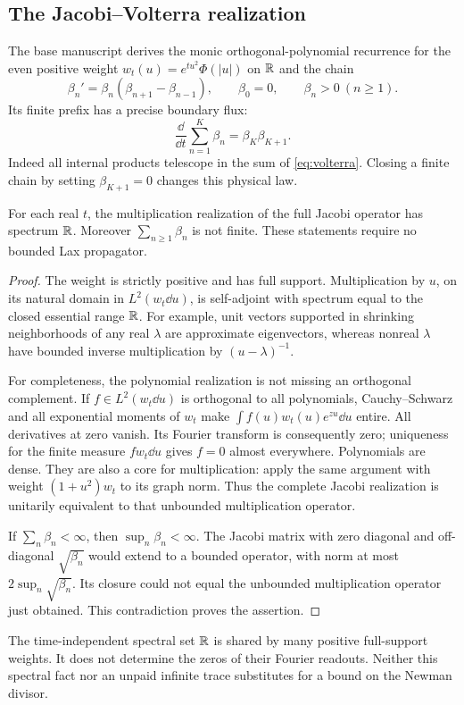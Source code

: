\subsection{The Jacobi--Volterra realization}
The base manuscript \cite{BakerVolterra2026} derives the monic
orthogonal-polynomial recurrence for the even positive weight
$w_t(u)=e^{tu^2}\Phi(|u|)$ on $\mathbb R$ and the chain
\begin{equation}
 \beta_n'=\beta_n(\beta_{n+1}-\beta_{n-1}),\qquad
 \beta_0=0,\qquad \beta_n>0\ (n\ge1).
 \label{eq:volterra}
\end{equation}
Its finite prefix has a precise boundary flux:
\begin{equation}
 \frac{\dd}{\dd t}\sum_{n=1}^K\beta_n=\beta_K\beta_{K+1}.
 \label{eq:prefix}
\end{equation}
Indeed all internal products telescope in the sum of
\eqref{eq:volterra}. Closing a finite chain by setting
$\beta_{K+1}=0$ changes this physical law.

\begin{proposition}
For each real $t$, the multiplication realization of the full Jacobi
operator has spectrum $\mathbb R$. Moreover $\sum_{n\ge1}\beta_n$ is not
finite. These statements require no bounded Lax propagator.
\end{proposition}
\begin{proof}
The weight is strictly positive and has full support. Multiplication
by $u$, on its natural domain in $L^2(w_t\dd u)$, is self-adjoint
with spectrum equal to the closed essential range $\mathbb R$. For example,
unit vectors supported in shrinking neighborhoods of any real
$\lambda$ are approximate eigenvectors, whereas nonreal $\lambda$
have bounded inverse multiplication by $(u-\lambda)^{-1}$.

For completeness, the polynomial realization is not missing an
orthogonal complement. If $f\in L^2(w_t\dd u)$ is orthogonal to all
polynomials, Cauchy--Schwarz and all exponential moments of $w_t$
make $\int f(u)w_t(u)e^{zu}\dd u$ entire. All derivatives at zero
vanish. Its Fourier transform is consequently zero; uniqueness for
the finite measure $f w_t\dd u$ gives $f=0$ almost everywhere.
Polynomials are dense. They are also a core for multiplication:
apply the same argument with weight $(1+u^2)w_t$ to its graph norm.
Thus the complete Jacobi realization is unitarily equivalent to
that unbounded multiplication operator.

If $\sum_n\beta_n<\infty$, then $\sup_n\beta_n<\infty$.
The Jacobi matrix with zero diagonal and off-diagonal
$\sqrt{\beta_n}$ would extend to a bounded operator, with norm at
most $2\sup_n\sqrt{\beta_n}$. Its closure could not equal the
unbounded multiplication operator just obtained. This contradiction
proves the assertion.
\end{proof}

The time-independent spectral set $\mathbb R$ is shared by many positive
full-support weights. It does not determine the zeros of their
Fourier readouts. Neither this spectral fact nor an unpaid infinite
trace substitutes for a bound on the Newman divisor.
